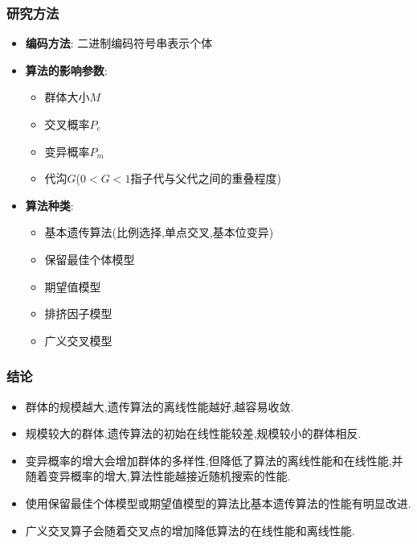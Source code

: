 \documentclass{beamer}
\begin{document}
	\begin{frame}
		\frametitle{研究方法}
		\begin{itemize}
			\item \textbf{编码方法}: 二进制编码符号串表示个体
			\item \textbf{算法的影响参数}: \begin{itemize}
				\item 群体大小$M$
				\item 交叉概率$P_c$
				\item 变异概率$P_m$
				\item 代沟$G$($0<G<1$指子代与父代之间的重叠程度)
			\end{itemize}
			\item \textbf{算法种类}: \begin{itemize}
				\item 基本遗传算法(比例选择,单点交叉,基本位变异)
				\item 保留最佳个体模型
				\item 期望值模型
				\item 排挤因子模型
				\item 广义交叉模型
			\end{itemize}
		\end{itemize}
	\end{frame}
	\begin{frame}
		\frametitle{结论}
	\begin{itemize}
		\item 群体的规模越大,遗传算法的离线性能越好,越容易收敛.
		\item 规模较大的群体,遗传算法的初始在线性能较差,规模较小的群体相反.
		\item 变异概率的增大会增加群体的多样性,但降低了算法的离线性能和在线性能,并随着变异概率的增大,算法性能越接近随机搜索的性能.
		\item 使用保留最佳个体模型或期望值模型的算法比基本遗传算法的性能有明显改进.
		\item 广义交叉算子会随着交叉点的增加降低算法的在线性能和离线性能.
	\end{itemize}
	\end{frame}
\end{document}
